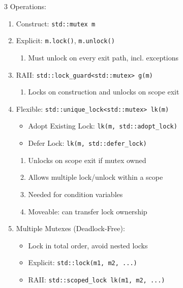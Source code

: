 \documentclass[12pt, a4paper]{article}
\begin{document}
\begin{multicols*}{3}
Operations:
\begin{enumerate}[\roman*.]
  \item Construct: \lstinline|std::mutex m|
  \item Explicit: \lstinline|m.lock()|, \lstinline|m.unlock()|
  \begin{enumerate}[leftmargin=*, label=$-$]\vspace{3pt}
    \item Must unlock on every exit path, incl. exceptions
  \end{enumerate}
  \item RAII: \lstinline|std::lock_guard<std::mutex> g(m)| 
  \begin{enumerate}[leftmargin=*, label=$+$]\vspace{3pt}
    \item Locks on construction and unlocks on scope exit
  \end{enumerate}
  \item Flexible: \lstinline|std::unique_lock<std::mutex> lk(m)| 
  \begin{itemize}[leftmargin=*]\vspace{3pt}
    \item Adopt Existing Lock: \lstinline|lk(m, std::adopt_lock)|
    \item Defer Lock: \lstinline|lk(m, std::defer_lock)|
  \end{itemize}
  \begin{enumerate}[leftmargin=*, label=$+$]\vspace{5pt}
    \item Unlocks on scope exit if mutex owned
    \item Allows multiple lock/unlock within a scope 
    \item Needed for condition variables
    \item Moveable: can transfer lock ownership
  \end{enumerate}
  \item Multiple Mutexes (Deadlock-Free):
    \begin{itemize}[leftmargin=*]\vspace{3pt}
      \item Lock in total order, avoid nested locks
      \item Explicit: \lstinline|std::lock(m1, m2, ...)| 
      \item RAII: \lstinline|std::scoped_lock lk(m1, m2, ...)| 
    \end{itemize}
\end{enumerate}
\vspace{-1em}
\colbreak

\end{multicols*}
\end{document}
